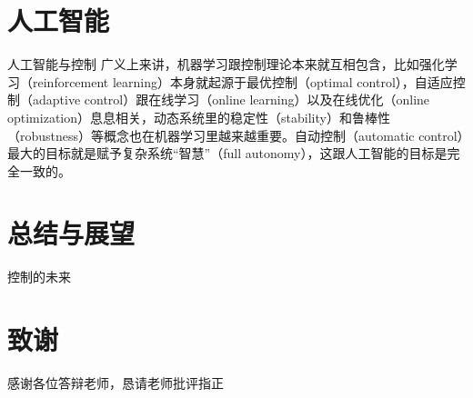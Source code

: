 \documentclass[10pt]{ctexbeamer}
\begin{document}
\section{人工智能}

\begin{frame}{人工智能与控制}
  广义上来讲，机器学习跟控制理论本来就互相包含，比如强化学习（reinforcement learning）本身就起源于最优控制（optimal control），自适应控制（adaptive control）跟在线学习（online learning）以及在线优化（online optimization）息息相关，动态系统里的稳定性（stability）和鲁棒性（robustness）等概念也在机器学习里越来越重要。自动控制（automatic control）最大的目标就是赋予复杂系统“智慧”（full autonomy），这跟人工智能的目标是完全一致的。
\end{frame}

\section{总结与展望}
    \begin{frame}{控制的未来}
    \end{frame}



\section*{致谢}  
  \begin{frame}
  \textcolor{rstd}{\Huge{}}
  \vspace{8pt}
  
  \textcolor{rgreen}{\songti\centerline{感谢各位答辩老师，恳请老师批评指正}}
  \end{frame}
\end{document}
